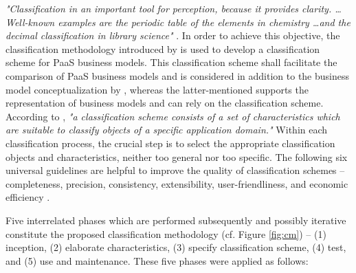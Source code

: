 \textit{"Classification in an important tool for perception, because it provides clarity. \ldots Well-known examples are the periodic table of the elements in chemistry \ldots and the decimal classification in library science"} \citep[p. 36]{Fettke2003}. In order to achieve this objective, the classification methodology introduced by \citet{Fettke2003} is used to develop a classification scheme for \ac{PaaS} business models. This classification scheme shall facilitate the comparison of \ac{PaaS} business models and is considered in addition to the business model conceptualization by \citet{Johnson2008}, whereas the latter-mentioned supports the representation of business models and can rely on the classification scheme. According to \citet[p. 39]{Fettke2003}, \textit{"a classification scheme consists of a set of characteristics which are suitable to classify objects of a specific application domain."} Within each classification process, the crucial step is to select the appropriate classification objects and characteristics, neither too general nor too specific. The following six universal guidelines are helpful to improve the quality of classification schemes -- completeness, precision, consistency, extensibility, user-friendliness, and economic efficiency \citep[pp. 40-41]{Fettke2003}. 

Five interrelated phases which are performed subsequently and possibly iterative constitute the proposed classification methodology (cf. Figure \ref{fig:cm}) -- (1) inception, (2) elaborate characteristics, (3) specify classification scheme, (4) test, and (5) use and maintenance. These five phases were applied as follows:

